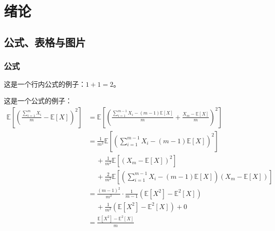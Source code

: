 \chapter{绪论}
    \section{公式、表格与图片}
	
	\subsection{公式}
这是一个行内公式的例子：$1+1=2$。\par
这是一个公式的例子：
\begin{align*}
\mathbb{E}\left[\left(\frac{\sum_{i=1}^m X_i}{m} -\mathbb{E}[X]\right)^2\right]&=\mathbb{E}\left[\left(\frac{\sum_{i=1}^{m-1} X_i-(m-1)\mathbb{E}[X]}{m} +\frac{X_m-\mathbb{E}[X]}{m}\right)^2\right]\tag{1-1}\\
&=\frac{1}{m^2}\mathbb E\left[\left(\sum_{i=1}^{m-1} X_i-(m-1)\mathbb{E}[X]\right)^2\right]\label{1.2}\\
&\quad\ + \frac{1}{m^2} \mathbb{E}[(X_m-\mathbb{E}[X])^2]\\
&\quad\ +\frac{2}{m^2}\mathbb{E}\left[\left(\sum_{i=1}^{m-1} X_i-(m-1)\mathbb{E}[X]\right)(X_m-\mathbb{E}[X]) \right]\tag{1-2}\\
&=\frac{(m-1)^2}{m^2}\cdot\frac 1{m-1}(\mathbb{E}[X^2]-\mathbb{E}^2[X])\\
&\quad\ +\frac{1}{m^2}(\mathbb{E}[X^2]-\mathbb{E}^2[X])+0\tag{1-3}\\
&=\frac{\mathbb{E}[X^2]-\mathbb{E}^2[X]}{m}\tag{1-4}
\end{align*}


